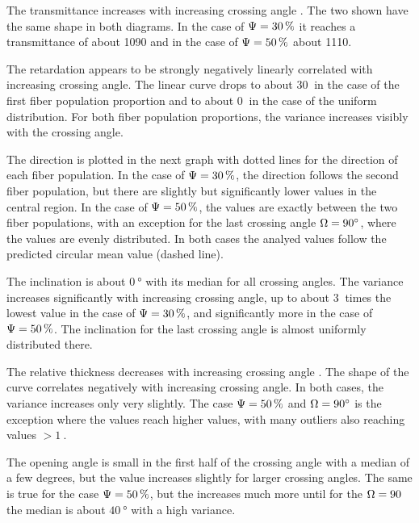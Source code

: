 \par
The transmittance increases with increasing crossing angle \modelOmega{}. The two \modelPsi shown have the same shape in both diagrams. In the case of $\textnormal{$\Psi$} = \SI{30}{\percent}$ it reaches a transmittance of about \SI{1090}{} and in the case of $\textnormal{$\Psi$} = \SI{50}{\percent}$ about \SI{1110}{}.
\par
The retardation appears to be strongly negatively linearly correlated with increasing crossing angle.
The linear curve drops to about $\SI{30}{}$ in the case of the first fiber population proportion and to about $\SI{0}{}$ in the case of the uniform distribution.
For both fiber population proportions, the variance increases visibly with the crossing angle.
\par
The direction is plotted in the next graph with dotted lines for the direction of each fiber population.
In the case of $\textnormal{$\Psi$} = \SI{30}{\percent}$, the direction follows the second fiber population, but there are slightly but significantly lower values in the central region.
In the case of $\textnormal{$\Psi$} = \SI{50}{\percent}$, the values are exactly between the two fiber populations, with an exception for the last crossing angle $\textnormal{$\Omega$} = \SI{90}{\degree}$, where the values are evenly distributed.
In both cases the analyed values follow the predicted circular mean value (dashed line).
\par
The inclination is about $\SI{0}{\degree}$ with its median for all crossing angles.
The variance increases significantly with increasing crossing angle, up to about $\SI{3}{}$ times the lowest value in the case of $\textnormal{$\Psi$} = \SI{30}{\percent}$, and significantly more in the case of $\textnormal{$\Psi$} = \SI{50}{\percent}$.
The inclination for the last crossing angle is almost uniformly distributed there.
\par
The relative thickness \trel{} decreases with increasing crossing angle \modelOmega{}.
The shape of the curve correlates negatively with increasing crossing angle.
In both cases, the variance increases only very slightly.
The case $\textnormal{$\Psi$} = \SI{50}{\percent}$ and $\textnormal{$\Omega$} = \SI{90}{\degree}$ is the exception where the \trel{} values reach higher values, with many outliers also reaching values $>\SI{1}{}$.
\par
The opening angle \openingAngle{} is small in the first half of the crossing angle with a median of a few degrees, but the value increases slightly for larger crossing angles.
The same is true for the case $\textnormal{$\Psi$} = \SI{50}{\percent}$, but the \openingAngle{} increases much more until for the $\textnormal{$\Omega$} = \SI{90}{}$ the median is about $\SI{40}{\degree}$ with a high variance.
%
% 
%
